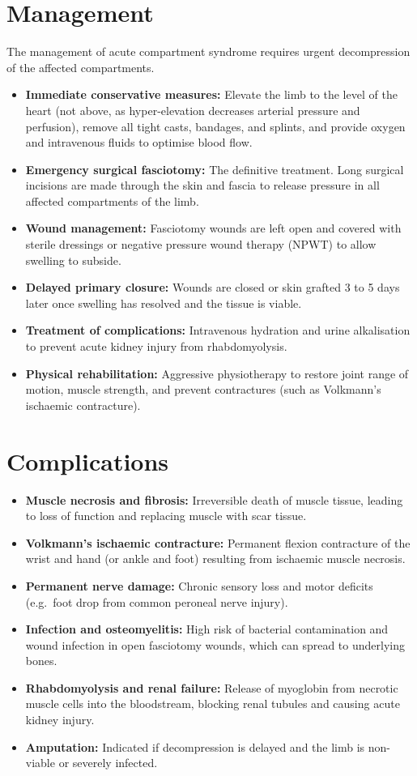 \section*{Management}
The management of acute compartment syndrome requires urgent decompression of the affected compartments.
\begin{itemize}
    \item \textbf{Immediate conservative measures:} Elevate the limb to the level of the heart (not above, as hyper-elevation decreases arterial pressure and perfusion), remove all tight casts, bandages, and splints, and provide oxygen and intravenous fluids to optimise blood flow.
    \item \textbf{Emergency surgical fasciotomy:} The definitive treatment. Long surgical incisions are made through the skin and fascia to release pressure in all affected compartments of the limb.
    \item \textbf{Wound management:} Fasciotomy wounds are left open and covered with sterile dressings or negative pressure wound therapy (NPWT) to allow swelling to subside.
    \item \textbf{Delayed primary closure:} Wounds are closed or skin grafted 3 to 5 days later once swelling has resolved and the tissue is viable.
    \item \textbf{Treatment of complications:} Intravenous hydration and urine alkalisation to prevent acute kidney injury from rhabdomyolysis.
    \item \textbf{Physical rehabilitation:} Aggressive physiotherapy to restore joint range of motion, muscle strength, and prevent contractures (such as Volkmann's ischaemic contracture).
\end{itemize}

\section*{Complications}
\begin{itemize}
    \item \textbf{Muscle necrosis and fibrosis:} Irreversible death of muscle tissue, leading to loss of function and replacing muscle with scar tissue.
    \item \textbf{Volkmann's ischaemic contracture:} Permanent flexion contracture of the wrist and hand (or ankle and foot) resulting from ischaemic muscle necrosis.
    \item \textbf{Permanent nerve damage:} Chronic sensory loss and motor deficits (e.g.\ foot drop from common peroneal nerve injury).
    \item \textbf{Infection and osteomyelitis:} High risk of bacterial contamination and wound infection in open fasciotomy wounds, which can spread to underlying bones.
    \item \textbf{Rhabdomyolysis and renal failure:} Release of myoglobin from necrotic muscle cells into the bloodstream, blocking renal tubules and causing acute kidney injury.
    \item \textbf{Amputation:} Indicated if decompression is delayed and the limb is non-viable or severely infected.
\end{itemize}

